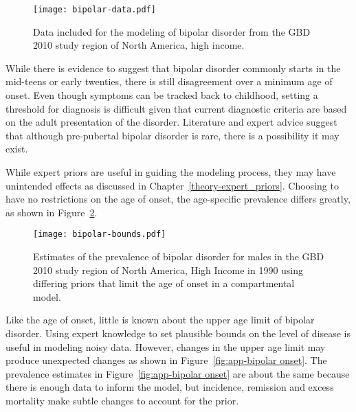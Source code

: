     \begin{figure}[h]
        \begin{center}
            \texttt{[image: bipolar-data.pdf]}
            \caption{Data included for the modeling of bipolar
              disorder from the GBD 2010 study region of North America,
              high income.}
            \label{fig:app-bipolar data}
        \end{center}
    \end{figure}

While there is evidence to suggest that bipolar disorder commonly
starts in the mid-teens or early twenties, there is still disagreement
over a minimum age of onset.  Even though symptoms can be tracked back
to childhood, setting a threshold for diagnosis is difficult given
that current diagnostic criteria are based on the adult presentation of
the disorder.  Literature and expert advice suggest that although
pre-pubertal bipolar disorder is rare, there is a possibility it may
exist. \cite{kloos_bipolar_2011, angst_historical_2000}

While expert priors are useful in guiding the modeling process, they
may have unintended effects as discussed in Chapter~\ref{theory-expert_priors}.
Choosing to have no restrictions on the
age of onset, the age-specific prevalence differs greatly, as shown in
Figure~\ref{fig:app-bipolar bounds}.

    \begin{figure}[h]
        \begin{center}
            \texttt{[image: bipolar-bounds.pdf]}
            \caption{Estimates of the prevalence of bipolar disorder
              for males in the GBD 2010 study region of North America, High Income
              in 1990 using differing priors that limit the age of onset
              in a compartmental model.}
            \label{fig:app-bipolar bounds}
        \end{center}
    \end{figure}

Like the age of onset, little is known about the upper age limit of
bipolar disorder.  Using expert knowledge to set plausible bounds on the
level of disease is useful in modeling noisy data.  However, changes in the upper age
limit may produce unexpected changes as shown in Figure~\ref{fig:app-bipolar onset}.
The prevalence estimates in Figure~\ref{fig:app-bipolar onset} are about
the same because there is enough data to inform the model, but incidence,
remission and excess mortality make subtle changes to account for the prior.

